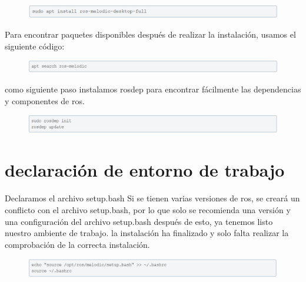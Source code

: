 \documentclass[11pt,a4paper,oldfontcommands]{memoir}
\begin{document}
\begin{figure}[h]
\includegraphics[scale=.8]{link13.png}
\end{figure}

Para encontrar paquetes disponibles después de realizar la instalación, usamos el siguiente código:

\begin{figure}[h]
\includegraphics[scale=.8]{link15.png}
\end{figure}

como siguiente paso instalamos rosdep para encontrar fácilmente las dependencias y componentes de ros.

\begin{figure}[h]
\includegraphics[scale=.8]{link16.png}
\end{figure}

\section{declaración de entorno de trabajo}
Declaramos el archivo setup.bash
Si se tienen varias versiones de ros, se creará un conflicto con el archivo setup.bash, por lo que solo se recomienda una versión y una configuración del archivo setup.bash
después de esto, ya tenemos listo nuestro ambiente de trabajo. la instalación ha finalizado y solo falta realizar la comprobación de la correcta instalación.

\begin{figure}[h]
\includegraphics[scale=.8]{link17.png}
\end{figure}


 
\end{document}
